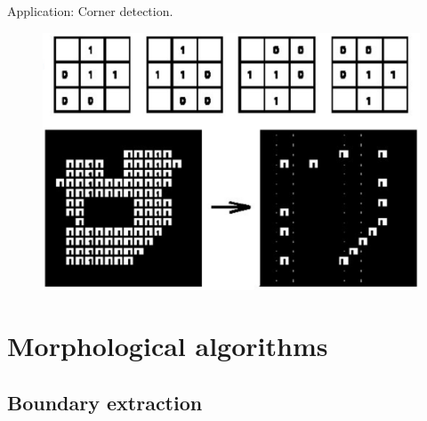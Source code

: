 \begin{frame}
Application: Corner detection.
\begin{figure}[!h]
\includegraphics[width=.8\textwidth]{hit-or-miss}
\end{figure}
\end{frame}

\section{Morphological algorithms}

\subsection{Boundary extraction}

